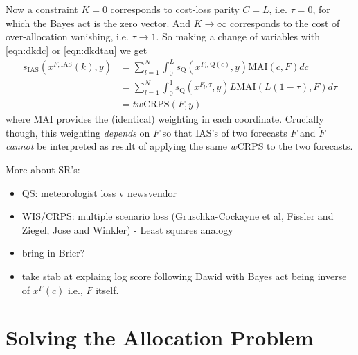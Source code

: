 \documentclass{article}
\begin{document}
Now a constraint $K = 0$ corresponds to cost-loss parity $C=L$, i.e. $\tau = 0$, for which the Bayes act is the zero vector.  And $K \to \infty$ corresponds to the cost of over-allocation vanishing, i.e. $\tau \to 1$. So making a change of variables with \eqref{eqn:dkdc} or \eqref{eqn:dkdtau} we get
\begin{align}
s_{\mathrm{IAS}}(x^{F, \mathrm{IAS}}(k), y) 
&= \sum_{l=1}^N \int_0^{L} s_{\mathrm{Q}}(x^{F_l, \mathrm{Q}(c)}, y) \mathrm{MAI}(c,F) dc \\
&= \sum_{l=1}^N \int_0^{1} s_{\mathrm{Q}}(x^{F_l, \tau}, y) L\mathrm{MAI}(L(1-\tau),F) d\tau \\
&= tw\mathrm{CRPS}(F,y)
\end{align}
where MAI provides the (identical) weighting in each coordinate. Crucially though, this weighting \emph{depends} on $F$ so that IAS's of two forecasts $F$ and $\tilde{F}$ \emph{cannot} be interpreted as result of applying the same $w$CRPS to the two forecasts.

More about SR's:
\begin{itemize}
\item QS: meteorologist loss v newsvendor
\item WIS/CRPS: multiple scenario loss (Gruschka-Cockayne et al, Fissler and Ziegel, Jose and Winkler)
	- Least squares analogy
\item bring in Brier?
\item take stab at explaing log score following Dawid with Bayes act being inverse of $x^F(c)$ i.e., $F$ itself.
\end{itemize}



\section{Solving the Allocation Problem}
\end{document}
